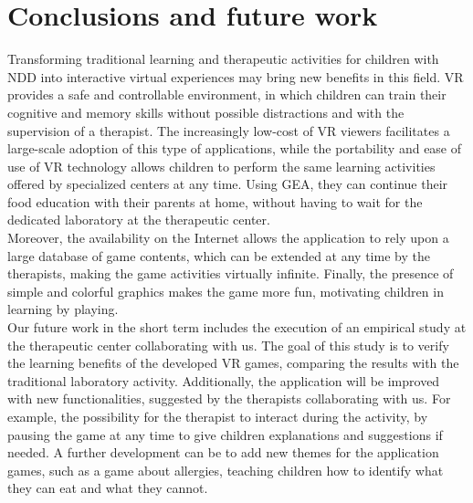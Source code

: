 \documentclass{sigchi-ext}
\begin{document}
\section{Conclusions and future work}
Transforming traditional learning and therapeutic activities for children with NDD into interactive virtual experiences may bring new benefits in this field. VR provides a safe and controllable environment, in which children can train their cognitive and memory skills without possible distractions and with the supervision of a therapist. The increasingly low-cost of VR viewers facilitates a large-scale adoption of this type of applications, while the portability and ease of use of VR technology allows children to perform the same learning activities offered by specialized centers at any time. Using GEA, they can continue their food education with their parents at home, without having to wait for the dedicated laboratory at the therapeutic center.\\
Moreover, the availability on the Internet allows the application to rely upon a large database of game contents, which can be extended at any time by the therapists, making the game activities virtually infinite. Finally, the presence of simple and colorful graphics makes the game more fun, motivating children in learning by playing.\\
\medskip
Our future work in the short term includes the execution of an empirical study at the therapeutic center collaborating with us. The goal of this study is to verify the learning benefits of the developed VR games, comparing the results with the traditional laboratory activity. Additionally, the application will be improved with new functionalities, suggested by the therapists collaborating with us. For example, the possibility for the therapist to interact during the activity, by pausing the game at any time to give children explanations and suggestions if needed. A further development can be to add new themes for the application games, such as a game about allergies, teaching children how to identify what they can eat and what they cannot.
\end{document}
